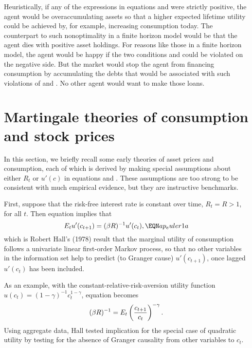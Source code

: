 Heuristically, if any of the expressions in equations  and
 were strictly positive, the agent would be overaccumulating
assets so that a higher expected lifetime utility could be achieved by,
for example, increasing consumption today. The counterpart to such
nonoptimality in a finite horizon model would be that the agent dies
with positive asset holdings. For reasons  like those
in a finite horizon model, the agent would be happy if the two
conditions  and  could be violated on the negative
side. But the market would stop the agent from
financing consumption by accumulating the debts that would be
associated with  such  violations of  and . No
other agent would want to make those loans.

\section{Martingale theories of consumption and stock prices}

In this section, we briefly recall some early theories
of asset prices and consumption, each of which is derived by
making special assumptions about either $R_t$ or $u'(c)$ in equations
 and .  These assumptions are too strong
to be consistent with much empirical evidence, but they are instructive
benchmarks.

First, suppose that the risk-free interest rate is constant over time,
$R_t=R>1$, for all $t$.  Then equation  implies that
$$E_t u'(c_{t+1}) =(\be R)^{-1} u'(c_t),                    \EQN ap_euler1a  $$
which is Robert Hall's (1978) result that the marginal utility of consumption
follows a univariate linear first-order Markov process, so that no other
variables in the information set help to predict (to Granger cause)
$u'(c_{t+1})$, once lagged $u'(c_t)$ has been included.

As an example,  with the constant-relative-risk-aversion utility function
$u(c_t)=(1-\gamma)^{-1} c_t^{1- \gamma}$, equation  becomes
$$ (\beta R)^{-1} = E_t \left(c_{t+1} \over c_t \right)^{-\gamma}.  $$
Using aggregate data, Hall tested implication  for the special case of
quadratic utility by testing for the absence of Granger causality from other
variables to $c_t$.

